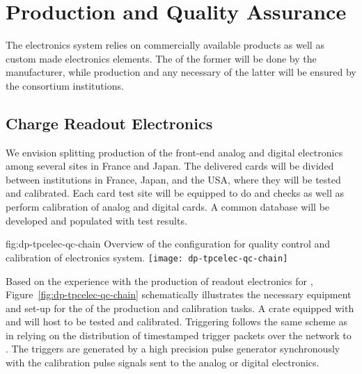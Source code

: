 \section{Production and Quality Assurance}
\label{sec:dp-tpcelec-production}

The   electronics system relies on commercially available products as well as custom made electronics elements. The  of the former will be done by the manufacturer, while production and any necessary  of the latter will be ensured by the consortium institutions. 


\subsection{Charge Readout Electronics}
\label{ssec:dp-tpcelec-prod-cro}

We envision splitting production of the front-end analog and digital electronics among several sites in France and Japan. The delivered cards will be divided between institutions in France, Japan, and the USA, where they will be tested and calibrated. Each card test site will be equipped to do  and  checks as well as perform calibration of analog and digital cards. A common database will be developed and populated with test results. 

\begin{dunefigure}{fig:dp-tpcelec-qc-chain}
{Overview of the configuration for quality control and calibration of  electronics system.}
\texttt{[image: dp-tpcelec-qc-chain]}
\end{dunefigure}

Based on the experience with the production of  readout electronics for , Figure~\ref{fig:dp-tpcelec-qc-chain} schematically illustrates the necessary equipment and set-up for the  of the production and calibration tasks. A  crate equipped with  and  will host  to be tested and calibrated. Triggering follows the same scheme as in  relying on the distribution of timestamped trigger packets over the  network to . The triggers are generated by a high precision pulse generator synchronously with the calibration pulse signals sent to the analog or digital electronics.  


